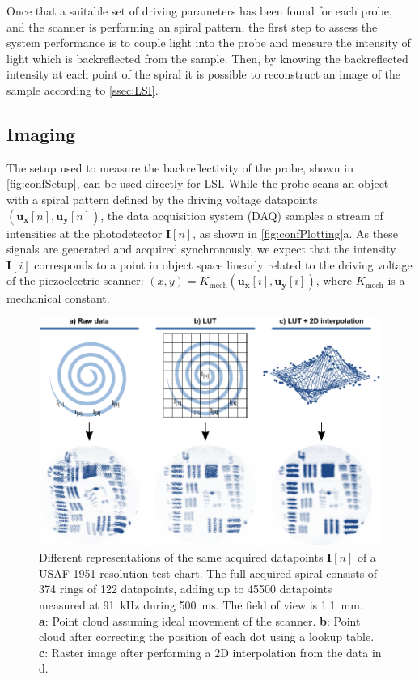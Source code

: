 Once that a suitable set of driving parameters has been found for each probe, and the scanner is performing an spiral pattern, the first step to assess the system performance is to couple light into the probe and measure the intensity of light which is backreflected from the sample. Then, by knowing the backreflected intensity at each point of the spiral it is possible to reconstruct an image of the sample according to \autoref{ssec:LSI}.


\subsection{Imaging}
The setup used to measure the backreflectivity of the probe, shown in \autoref{fig:confSetup}, can be used directly for LSI. While the probe scans an object with a spiral pattern defined by the driving voltage datapoints $(\mathbf{u_x}[n], \mathbf{u_y}[n])$, the data acquisition system (DAQ) samples a stream of intensities at the photodetector $\mathbf{I}[n]$, as shown in \autoref{fig:confPlotting}a. As these signals are generated and acquired synchronously, we expect that the intensity $\mathbf{I}[i]$ corresponds to a point in object space linearly related to the driving voltage of the piezoelectric scanner: $(x, y) = K_\mathrm{mech}(\mathbf{u_x}[i], \mathbf{u_y}[i])$, where $K_\mathrm{mech}$ is a mechanical constant.

\begin{figure}[h!]\centering \includegraphics{figures/50_Measurements/conf/proc/Plotting.pdf}
      \caption{Different representations of the same acquired datapoints $\mathbf{I}[n]$ of a USAF 1951 resolution test chart. The full acquired spiral consists of 374 rings of 122 datapoints, adding up to 45500 datapoints measured at \SI{91}{\kilo\hertz} during \SI{500}{\milli\second}. The field of view is \SI{1.1}{\milli\meter}.\\
      \textbf{a}: Point cloud assuming ideal movement of the scanner.
      \textbf{b}: Point cloud after correcting the position of each dot using a lookup table.
      \textbf{c}: Raster image after performing a 2D interpolation from the data in d.}
      \label{fig:confPlotting}
\end{figure}

